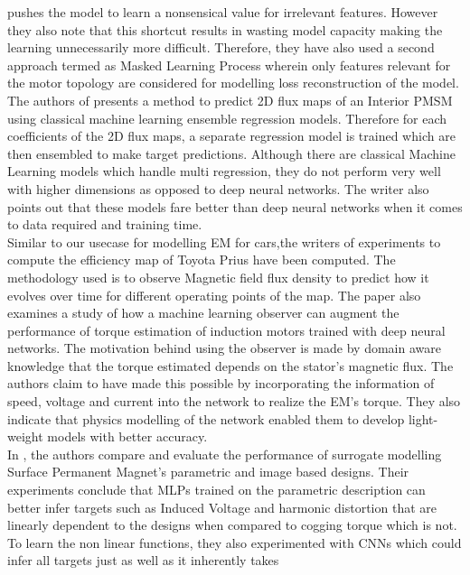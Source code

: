 \documentclass{report} %
\begin{document}
pushes the model to learn a nonsensical value for irrelevant features.
However they also note that this shortcut results in wasting model capacity making the learning unnecessarily more difficult.
Therefore, they have also used a second approach termed as Masked Learning Process wherein only features relevant for the motor topology are 
considered for modelling loss reconstruction of the model. \\
The authors of \cite{EM 2DFMP-2022} presents a method to predict 2\ac{D} flux maps of an Interior \ac{PMSM} using classical machine learning ensemble regression models.
Therefore for each coefficients of the 2\ac{D} flux maps, a separate regression model is trained which are then ensembled to make target predictions. 
Although there are classical Machine Learning models which handle multi regression, they do not perform very well with higher dimensions as 
opposed to deep neural networks. The writer also points out that these models fare better than deep neural networks when it comes to data required and training time.\\
Similar to our usecase for modelling \ac{EM} for cars,the writers of \cite{ETA-V-2020} experiments to compute the efficiency map of Toyota Prius have 
been computed. The methodology used is to observe Magnetic field flux density to predict how it evolves over time for different operating points of the map.
The paper \cite{HMLO-2021} also examines a study of how a machine learning observer can augment the performance of torque estimation of 
induction motors trained with deep neural networks.
The motivation behind using the observer is made by domain aware knowledge that the torque estimated depends on the stator's magnetic flux.
The authors claim to have made this possible by incorporating the information of speed, voltage and current into the network to realize the \ac{EM}'s torque.
They also indicate that physics modelling of the network enabled them to develop light-weight models with better accuracy.\\
In \cite{EM SM-2023}, the authors compare and evaluate the performance of surrogate modelling Surface Permanent Magnet's parametric and image based designs.
Their experiments conclude that \ac{MLP}s trained on the parametric description can better infer targets such as Induced Voltage and harmonic distortion 
that are linearly dependent to the designs when compared to cogging torque which is not.
To learn the non linear functions, they also experimented with \ac{CNN}s which could infer all targets just as well as it inherently takes 
\end{document}
